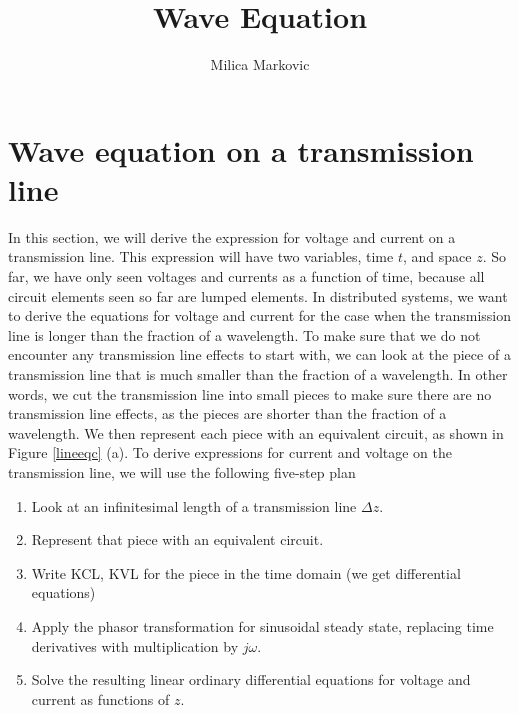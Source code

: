 \documentclass{ximera}
\title{Wave Equation}
\author{Milica Markovic}
\begin{document}
  
\begin{abstract}  

\end{abstract}  
\maketitle    



\section{ Wave equation on a transmission line}\label{telegrapher}

In this section, we will derive the expression for voltage and current
on a transmission line. This expression will have two variables, time $t$, and space $z$. 
So far, we have only seen voltages and currents as a function of time, because all circuit elements seen so far are lumped elements. In distributed systems,
we want to derive the equations for voltage and current for the case when the transmission
line is longer than the fraction of a wavelength.  To make sure that we
do not encounter any transmission line effects to start with, we can
look at the piece of a transmission line that is much smaller than
the fraction of a wavelength. In other words, we cut the transmission
line into small pieces to make sure there are no transmission line
effects, as the pieces are shorter than the fraction of a wavelength. We then represent each piece with
an equivalent circuit, as shown in Figure \ref{lineeqc} (a). 
To derive expressions for current and voltage on the transmission line, we will use the following five-step plan

\begin{enumerate}
\item Look at an infinitesimal length of a transmission line $\Delta z$.  

\item Represent that piece with an equivalent circuit. 

\item Write KCL, KVL for the piece in the time domain (we get
differential equations)

\item Apply the phasor transformation for sinusoidal steady
state, replacing time derivatives with multiplication by
$j\omega$.

\item Solve the resulting linear ordinary differential
equations for voltage and current as functions of $z$.

\end{enumerate}
\end{document}
